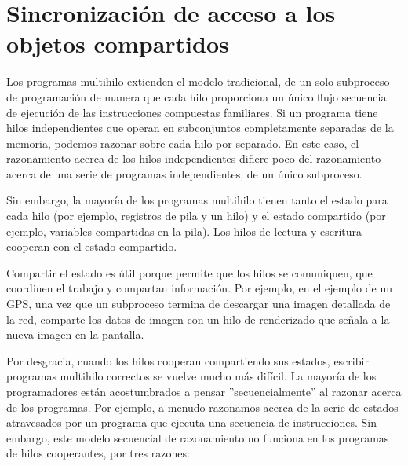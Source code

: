 \documentclass[10pt]{book}
\begin{document}
\chapter{Sincronización de acceso a los objetos compartidos}
Los programas multihilo extienden el modelo tradicional, de un solo subproceso de programación de manera que cada hilo proporciona un único flujo secuencial de ejecución de las instrucciones compuestas familiares. Si un programa tiene hilos independientes que operan en subconjuntos completamente separadas de la memoria, podemos razonar sobre cada hilo por separado. En este caso, el razonamiento acerca de los hilos independientes difiere poco del razonamiento acerca de una serie de programas independientes, de un único subproceso.

Sin embargo, la mayoría de los programas multihilo tienen tanto el estado para cada hilo (por ejemplo, registros de pila y un hilo) y el estado compartido (por ejemplo, variables compartidas en la pila). Los hilos de lectura y escritura cooperan con el estado compartido.

Compartir el estado es útil porque permite que los hilos se comuniquen, que coordinen el trabajo y compartan información. Por ejemplo, en el ejemplo de un GPS, una vez que un subproceso termina de descargar una imagen detallada de la red, comparte los datos de imagen con un hilo de renderizado que señala a la nueva imagen en la pantalla.

Por desgracia, cuando los hilos cooperan compartiendo sus estados, escribir programas multihilo correctos se vuelve mucho más difícil. La mayoría de los programadores están acostumbrados a pensar ''secuencialmente'' al razonar acerca de los programas. Por ejemplo, a menudo razonamos acerca de la serie de estados atravesados por un programa que ejecuta una secuencia de instrucciones. Sin embargo, este modelo secuencial de razonamiento no funciona en los programas de hilos cooperantes, por tres razones:
\end{document}
